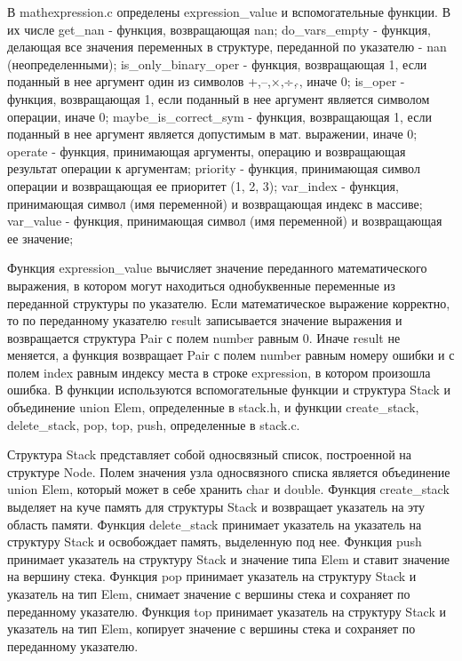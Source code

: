 \documentclass[a4paper,14pt]{extarticle}
\begin{document}
В mathexpression.c определены expression\_value и вспомогательные функции. В их числе 
get\_nan - функция, возвращающая nan;
do\_vars\_empty - функция, делающая все значения переменных в структуре, переданной по указателю - nan (неопределенными);
is\_only\_binary\_oper - функция, возвращающая 1, если поданный в нее аргумент один из символов +,–,×,÷,\,{$\hat{} $}, иначе 0;
is\_oper - функция, возвращающая 1, если поданный в нее аргумент является символом операции, иначе 0;
maybe\_is\_correct\_sym - функция, возвращающая 1, если поданный в нее аргумент является допустимым в мат. выражении, иначе 0;
operate - функция, принимающая аргументы, операцию и возвращающая результат операции к аргументам;
priority - функция, принимающая символ операции и возвращающая ее приоритет (1, 2, 3);
var\_index - функция, принимающая символ (имя переменной) и возвращающая индекс в массиве;
var\_value - функция, принимающая символ (имя переменной) и возвращающая ее значение;

Функция expression\_value вычисляет значение переданного математического выражения, в котором
могут находиться однобуквенные переменные из переданной структуры по указателю. Если
математическое выражение корректно, то по переданному указателю result записывается значение
выражения и возвращается структура Pair с полем number равным 0. Иначе result
не меняется, а функция возвращает Pair с полем number равным номеру ошибки и
с полем index равным индексу места в строке expression, в котором произошла ошибка. В функции используются вспомогательные функции и структура Stack и объединение union Elem, определенные в stack.h, и функции create\_stack, delete\_stack, pop, top, push, определенные в stack.c.

Структура Stack представляет собой односвязный список, построенной на структуре Node. Полем значения узла односвязного списка
является объединение union Elem, который может в себе хранить char и double.
Функция create\_stack выделяет на куче память для структуры Stack и возвращает указатель на эту область памяти.
Функция delete\_stack принимает указатель на указатель на структуру Stack и освобождает память, выделенную под нее.
Функция push принимает указатель на структуру Stack и значение типа Elem и ставит значение на вершину стека.
Функция pop принимает указатель на структуру Stack и указатель на тип Elem, снимает значение с вершины стека и сохраняет по переданному указателю.
Функция top принимает указатель на структуру Stack и указатель на тип Elem, копирует значение с вершины стека и сохраняет по переданному указателю.
\end{document}
